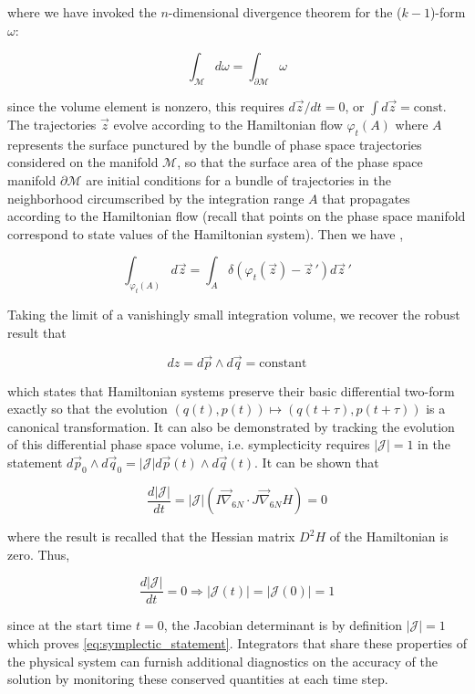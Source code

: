 \documentclass[11pt,titlepage]{report}
\begin{document}
\noindent where we have invoked the $n$-dimensional divergence theorem for the ($k-1$)-form $\omega$:

$$\int_{\mathcal{M}} d\omega = \int_{\mathcal{\partial M}} \omega$$

\noindent since the volume element is nonzero, this requires $d\vec{z}/dt = 0$, or $\int d\vec{z} = \mathrm{const}$. The trajectories $\vec{z}$ evolve according to the Hamiltonian flow $\varphi_t(A)$ where $A$ represents the surface punctured by the bundle of phase space trajectories considered on the manifold $\mathcal{M}$, so that the surface area of the phase space manifold $\partial\mathcal{M}$ are initial conditions for a bundle of trajectories in the neighborhood circumscribed by the integration range $A$ that propagates according to the Hamiltonian flow (recall that points on the phase space manifold correspond to state values of the Hamiltonian system). Then we have \cite{Meiss07},

$$\int_{\varphi_t(A)} d\vec{z} = \int_A \delta (\varphi_t(\vec{z}) - \vec{z}\,')d\vec{z}\,'$$

\noindent Taking the limit of a vanishingly small integration volume, we recover the robust result that

\begin{equation}
dz = d\vec{p}\wedge d\vec{q} = \mathrm{constant} \label{eq:symplectic_statement}
\end{equation}

\noindent which states that Hamiltonian systems preserve their basic differential two-form exactly so that the evolution $(q(t),p(t)) \mapsto (q(t + \tau ), p(t + \tau ))$ is a canonical transformation. It can also be demonstrated \cite{Tuckerman02} by tracking the evolution of this differential phase space volume, i.e. symplecticity requires $|\mathcal{J}| = 1$ in the statement $d\vec{p}_0\wedge d\vec{q}_0 = |\mathcal{J}|d\vec{p}(t)\wedge d\vec{q}(t)$. It can be shown that

$$\frac{d|\mathcal{J}|}{dt} = |\mathcal{J}|(I\vec{\nabla}_{6N}\cdot J\vec{\nabla}_{6N}H) = 0$$

\noindent where the result is recalled that the Hessian matrix $D^2H$ of the Hamiltonian is zero. Thus,

$$\frac{d|\mathcal{J}|}{dt} = 0 \Rightarrow |\mathcal{J}(t)| = |\mathcal{J}(0)| = 1$$

\noindent since at the start time $t = 0$, the Jacobian determinant is by definition $|\mathcal{J}| = 1$ which proves \eqref{eq:symplectic_statement}. Integrators that share these properties of the physical system can furnish additional diagnostics on the accuracy of the solution by monitoring these conserved quantities at each time step.
\end{document}

